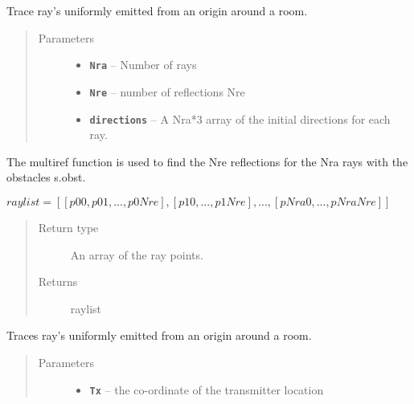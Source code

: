 \documentclass[letterpaper,10pt,english]{sphinxmanual}
\begin{document}
\begin{fulllineitems}
\begin{fulllineitems}
\label{index:Room.room.ray_bounce}
Trace ray's uniformly emitted from an origin around a room.
\begin{quote}\begin{description}
\item[{Parameters}] \leavevmode\begin{itemize}
\item {} 
\textbf{\texttt{Nra}} -- Number of rays

\item {} 
\textbf{\texttt{Nre}} -- number of reflections Nre

\item {} 
\textbf{\texttt{directions}} -- A Nra*3 array of the initial directions     for each ray.

\end{itemize}

\end{description}\end{quote}

The multiref function is used to find the Nre reflections for     the Nra rays with the obstacles s.obst.

\(raylist=[[p00,p01,...,p0Nre],[p10,...,p1Nre],...,[pNra0,...,pNraNre]]\)
\begin{quote}\begin{description}
\item[{Return type}] \leavevmode
An array of the ray points.

\item[{Returns}] \leavevmode
raylist

\end{description}\end{quote}

\end{fulllineitems}


\begin{fulllineitems}
\label{index:Room.room.ray_mesh_bounce}
Traces ray's uniformly emitted from an origin around a room.
\begin{quote}\begin{description}
\item[{Parameters}] \leavevmode\begin{itemize}
\item {} 
\textbf{\texttt{Tx}} -- the co-ordinate of the transmitter location


\end{itemize}
\end{description}
\end{quote}
\end{fulllineitems}
\end{fulllineitems}
\end{document}
